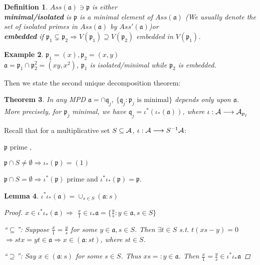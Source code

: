 \documentclass[11pt]{article}
\newtheorem{thm}{Theorem}[section]
\newtheorem{lemma}[thm]{Lemma}
\newtheorem{dfn}[thm]{Definition}
\newtheorem{ex}[thm]{Example}
\newcommand{\sca}{{\mathfrak a}}
\newcommand{\scp}{{\mathfrak p}}
\newcommand{\scq}{\mathfrak q}
\newcommand{\cala}{{\cal A}}
\newcommand{\Lrta}{\Longrightarrow}
\newcommand{\lrta}{\longrightarrow}
\begin{document}
\begin{dfn}
$Ass(\sca)\ni \scp$ is either \\
\textbf{minimal/isolated} is $\scp$ is a minimal element of $Ass(\sca)$ (We usually denote the set of isolated primes in $Ass(\sca)$ by $Ass'(\sca)$)or\\
\textbf{embedded} if $\scp_1\subsetneq \scp_2\Lrta V(\scp_1)\supseteq V(\scp_2)$ embedded in $V(\scp_1)$. 
\end{dfn}
\begin{ex}
$\scp_1=(x), \scp_2=(x,y)$\\
$\sca=\scp_1\cap\scp_2^2=(xy,x^2)$, $\scp_1$ is isolated/minimal while $\scp_2$ is embedded.
\end{ex}

Then we state the second unique decomposition theorem:
\begin{thm}\label{thm:secon_unique_decomposition}
In any MPD $\sca=\cap \scq_j$, $\{\scq_j:\scp_j\text{ is minimal}\}$ depends only upon $\sca$. More precisely, for $\scp_j$ minimal, we have $\scq_j=\iota^*(\iota_*(\sca))$, where $\iota:\cala\lrta \cala_{p_j}$
\end{thm}
Recall that for a multiplicative set $S\subseteq \cala$, $\iota:\cala\lrta S^{-1}\cala$:

$\scp$ prime ,

$\scp\cap S\neq\emptyset\Lrta \iota_*(\scp)=(1)$

$\scp\cap S=\emptyset\Lrta \iota^*(\scp)$ prime and $\iota^*\iota_*(\scp)=\scp$.

\begin{lemma}
$\iota^*\iota_*(\sca)=\cup_{s\in S}(\sca:s)$
\begin{proof}
$x\in \iota^*\iota_*(\sca)\Lrta $ $\frac{x}{1}\in\iota_*\sca=\{\frac{y}{s}:y\in\sca,s\in S\}$

``$\subseteq$'': Suppose $\frac{x}{1}=\frac{y}{s}$ for some $y\in\sca,s\in S$. Then $\exists t\in S$ s.t. $t(xs-y)=0$ $\Lrta stx=yt \in \sca\Lrta x\in (\sca:st)$, where $st\in S$.

``$\supseteq$'': Say $x\in (\sca:s)$ for some $s\in S$. Thus $xs=:y \in\sca$. Then $\frac{x}{1}=\frac{y}{s}\in \iota^*\iota_*\sca$ 
\end{proof}
\end{lemma}
\end{document}
